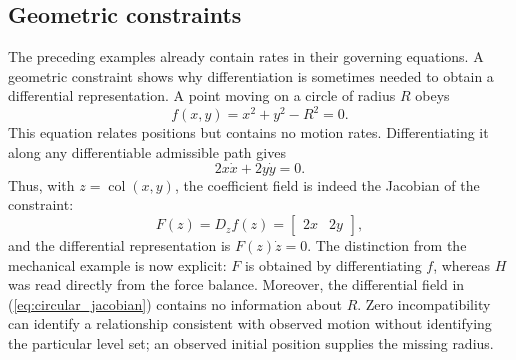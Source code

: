 \documentclass[journal]{IEEEtran}
\newcommand{\func}[1]{\operatorname{#1}}
\begin{document}
\subsection{Geometric constraints}
The preceding examples already contain rates in their governing equations. A
geometric constraint shows why differentiation is sometimes needed to obtain
a differential representation. A point moving on a circle of radius $R$
obeys 
\begin{equation}
f(x,y)=x^2+y^2-R^2=0.  \label{eq:circular_constraint}
\end{equation}
This equation relates positions but contains no motion rates.
Differentiating it along any differentiable admissible path gives 
\begin{equation}
2x\dot x+2y\dot y=0.  \label{eq:circular_differential}
\end{equation}
Thus, with $z=\func{col}(x,y)$, the coefficient field is indeed the Jacobian
of the constraint: 
\begin{equation}
F(z)=D_zf(z)=%
\begin{bmatrix}
2x & 2y%
\end{bmatrix}%
,  \label{eq:circular_jacobian}
\end{equation}
and the differential representation is $F(z)\dot z=0$. The distinction from
the mechanical example is now explicit: $F$ is obtained by differentiating $%
f $, whereas $H$ was read directly from the force balance. Moreover, the
differential field in (\ref{eq:circular_jacobian}) contains no information
about $R$. Zero incompatibility can identify a relationship consistent with
observed motion without identifying the particular level set; an observed
initial position supplies the missing radius.
%
\end{document}
